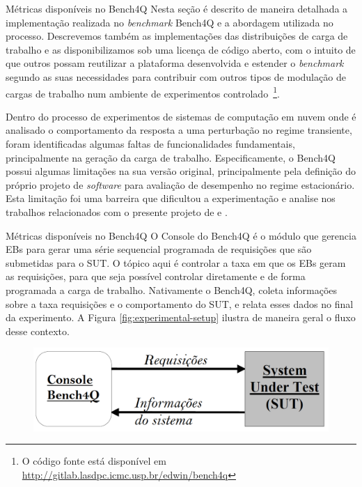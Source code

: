 \begin{frame}{Métricas disponíveis no Bench4Q}
	Nesta seção é descrito de maneira detalhada a implementação realizada no \textit{benchmark} Bench4Q e a abordagem utilizada no processo. Descrevemos também as implementações das distribuições de carga de trabalho e as disponibilizamos sob uma licença de código aberto, com o intuito de que outros possam reutilizar a plataforma desenvolvida e estender o \textit{benchmark} segundo as suas necessidades para contribuir com outros tipos de modulação de cargas de trabalho num ambiente de experimentos controlado~\footnote{O código fonte está disponível em \href{URL}{http://gitlab.lasdpc.icmc.usp.br/edwin/bench4q}}.
	
	Dentro do processo de experimentos de sistemas de computação em nuvem onde é analisado o comportamento da resposta a uma perturbação no regime transiente, foram identificadas algumas faltas de funcionalidades fundamentais, principalmente na geração da carga de trabalho. Especificamente, o Bench4Q possui algumas limitações na sua versão original, principalmente pela definição do próprio projeto de \textit{software} para avaliação de desempenho no regime estacionário. Esta limitação foi uma barreira que dificultou a experimentação e analise nos trabalhos relacionados com o presente projeto de \cite{Edwin2015} e \cite{Lourenco2015}.
\end{frame}

\begin{frame}{Métricas disponíveis no Bench4Q}
	O Console do Bench4Q é o módulo que gerencia EBs para gerar uma série sequencial programada de requisições que são submetidas para o SUT. O tópico aqui é controlar a taxa em que os EBs geram as requisições, para que seja possível controlar diretamente e de forma programada a carga de trabalho. Nativamente o Bench4Q, coleta informações sobre a taxa requisições e o comportamento do SUT, e relata esses dados no final da experimento. A Figura \ref{fig:experimental-setup} ilustra de maneira geral o fluxo desse contexto.
	
	\begin{figure}[htb]
		\centering
		\includegraphics[scale=0.2]{../monograph/images/experimental-setup.png}	
		\label{fig:cps-resp60}
	\end{figure}
	
\end{frame}

